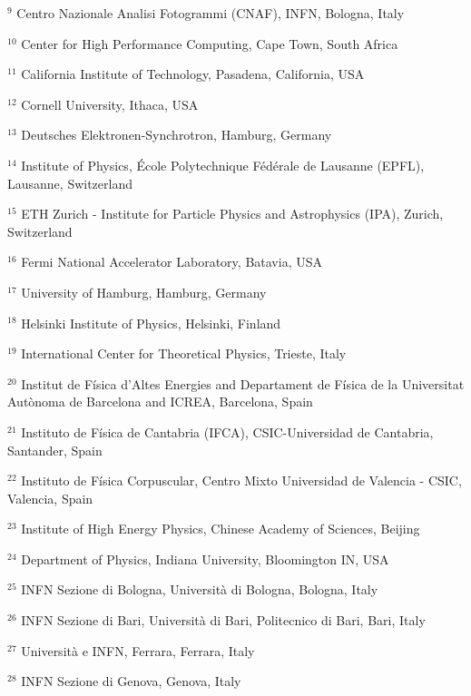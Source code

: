 \par {\footnotesize $^{9}$ Centro Nazionale Analisi Fotogrammi (CNAF), INFN, Bologna, Italy}
\par {\footnotesize $^{10}$ Center for High Performance Computing, Cape Town, South Africa}
\par {\footnotesize $^{11}$ California Institute of Technology, Pasadena, California, USA}
\par {\footnotesize $^{12}$ Cornell University, Ithaca, USA}
\par {\footnotesize $^{13}$ Deutsches Elektronen-Synchrotron, Hamburg, Germany}
\par {\footnotesize $^{14}$ Institute of Physics, École Polytechnique Fédérale de Lausanne (EPFL), Lausanne, Switzerland}
\par {\footnotesize $^{15}$ ETH Zurich - Institute for Particle Physics and Astrophysics (IPA), Zurich, Switzerland}
\par {\footnotesize $^{16}$ Fermi National Accelerator Laboratory, Batavia, USA}
\par {\footnotesize $^{17}$ University of Hamburg, Hamburg, Germany}
\par {\footnotesize $^{18}$ Helsinki Institute of Physics, Helsinki, Finland}
\par {\footnotesize $^{19}$ International Center for Theoretical Physics, Trieste, Italy}
\par {\footnotesize $^{20}$ Institut de Física d’Altes Energies and Departament de Física de la Universitat Autònoma de Barcelona and ICREA, Barcelona, Spain}
\par {\footnotesize $^{21}$ Instituto de Física de Cantabria (IFCA), CSIC-Universidad de Cantabria, Santander, Spain}
\par {\footnotesize $^{22}$ Instituto de Física Corpuscular, Centro Mixto Universidad de Valencia - CSIC, Valencia, Spain}
\par {\footnotesize $^{23}$ Institute of High Energy Physics, Chinese Academy of Sciences, Beijing}
\par {\footnotesize $^{24}$ Department of Physics, Indiana University, Bloomington IN, USA}
\par {\footnotesize $^{25}$ INFN Sezione di Bologna, Università di Bologna, Bologna, Italy}
\par {\footnotesize $^{26}$ INFN Sezione di Bari, Università di Bari, Politecnico di Bari, Bari, Italy}
\par {\footnotesize $^{27}$ Università e INFN, Ferrara, Ferrara, Italy}
\par {\footnotesize $^{28}$ INFN Sezione di Genova, Genova, Italy}
